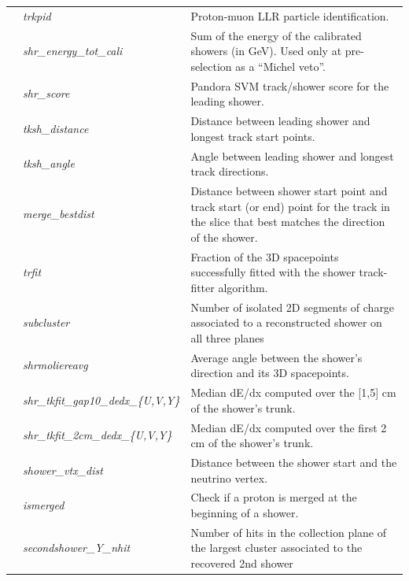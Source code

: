 \begin{table}[ht]
\begin{tabular}{ m{} | m{} | m{}  }
\hline
\multicolumn{1}{l|}{} & \emph{trkpid}  &  Proton-muon LLR particle identification. \\  \cline{2-3}
\parbox[t]{2mm}{}  & \emph{shr\_energy\_tot\_cali}  & Sum  of  the  energy  of  the  calibrated  showers  (in  GeV). Used  only  at pre-selection as a ``Michel veto”.\\  
 & \emph{shr\_score} & Pandora  SVM track/shower score for the leading shower.\\  
  & \emph{tksh\_distance}  & Distance between leading shower and longest track start points.\\  
 & \emph{tksh\_angle}  & Angle  between  leading  shower   and  longest  track directions.\\  
 & \emph{merge\_bestdist}  & Distance between shower start point and track start (or end) point for the track in the slice that best matches the direction of the shower.\\  
 & \emph{trfit} & Fraction of the 3D spacepoints successfully fitted with the shower track-fitter algorithm. \\  
 & \emph{subcluster} & Number of isolated 2D segments of charge associated to a reconstructed shower on all three planes  \\  
 & \emph{shrmoliereavg} &  Average angle between the shower’s direction and its 3D spacepoints.    \\ 
 & \emph{shr\_tkfit\_gap10\_dedx\_\{U,V,Y\}}  & Median dE/dx computed over the [1,5] cm of the shower’s  trunk. \\ 
 & \emph{shr\_tkfit\_2cm\_dedx\_\{U,V,Y\}}  & Median dE/dx computed  over  the first 2 cm of the shower’s  trunk. \\ 
 & \emph{shower\_vtx\_dist} & Distance between the shower start and the neutrino vertex.\\ 
 & \emph{ismerged} & Check if a proton is merged at the beginning of a shower.\\ 
\hline
\hline
{} & \emph{secondshower\_Y\_nhit} & Number of hits in the collection plane of the largest cluster associated to the  recovered 2nd shower  \\  

\end{tabular}
\end{table}
